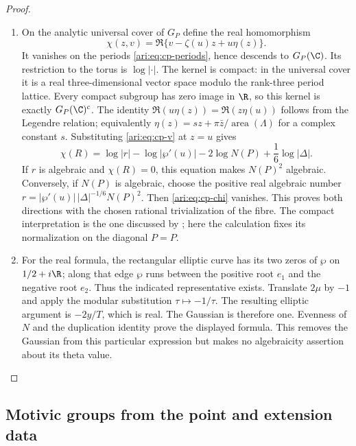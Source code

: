 \begin{proof}
\begin{enumerate}[label=\arabic*.,leftmargin=*]
\item On the analytic universal cover of $G_P$ define the real
homomorphism
\[
 \chi(z,v)=\Re\{v-\zeta(u)z+u\eta(z)\}.
\]
It vanishes on the periods \eqref{ari:eq:cp-periods}, hence descends
to $G_P(\C)$. Its restriction to the torus is $\log|\cdot|$.
The kernel is compact: in the universal cover it is a real
three-dimensional vector space modulo the rank-three period
lattice. Every compact subgroup has zero image in $\R$, so
this kernel is exactly $G_P(\C)^c$.
The identity
$\Re(u\eta(z))=\Re(z\eta(u))$ follows from the Legendre relation;
equivalently $\eta(z)=sz+\pi\bar z/\operatorname{area}(\Lambda)$
for a complex constant $s$. Substituting
\eqref{ari:eq:cp-v} at $z=u$ gives
\begin{equation}\label{ari:eq:cp-chi}
 \chi(R)=\log|r|-\log|\wp'(u)|
            -2\log N(P)+\frac16\log|\Delta|.
\end{equation}
If $r$ is algebraic and $\chi(R)=0$, this equation makes
$N(P)^2$ algebraic. Conversely, if $N(P)$ is algebraic,
choose the positive real algebraic number
$r=|\wp'(u)|\,|\Delta|^{-1/6}N(P)^2$.
Then \eqref{ari:eq:cp-chi} vanishes. This proves both directions
with the chosen rational trivialization of the fibre.
The compact interpretation is the one discussed by
\citet[slides 5--8]{bertrand2017}; here the calculation fixes
its normalization on the diagonal $P=P$.

\item For the real formula, the rectangular elliptic curve has its
two zeros of $\wp$ on $1/2+i\R$; along that edge $\wp$ runs
between the positive root $e_1$ and the negative root $e_2$.
Thus the indicated representative exists. Translate $2\mu$
by $-1$ and apply the modular substitution $\tau\mapsto-1/\tau$.
The resulting elliptic argument is $-2y/T$, which is real.
The Gaussian is therefore one. Evenness of $N$ and the
duplication identity prove the displayed formula. This removes
the Gaussian from this particular expression but makes no
algebraicity assertion about its theta value.
\end{enumerate}
\end{proof}

\subsection{Motivic groups from the point and extension data}

